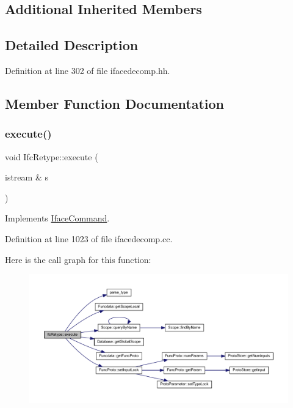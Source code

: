\subsection*{Additional Inherited Members}


\subsection{Detailed Description}


Definition at line 302 of file ifacedecomp.\+hh.



\subsection{Member Function Documentation}
\mbox{\label{class_ifc_retype_a045af05120fda8cc7fa637714db8ca22}} 
\subsubsection{\texorpdfstring{execute()}{execute()}}
{\footnotesize\ttfamily void Ifc\+Retype\+::execute (\begin{DoxyParamCaption}\item[{istream \&}]{s }\end{DoxyParamCaption})\hspace{0.3cm}{\ttfamily [virtual]}}



Implements \mbox{\hyperlink{class_iface_command_af10e29cee2c8e419de6efe9e680ad201}{Iface\+Command}}.



Definition at line 1023 of file ifacedecomp.\+cc.

Here is the call graph for this function\+:
\nopagebreak
\begin{figure}[H]
\begin{center}
\leavevmode
\includegraphics[width=350pt]{class_ifc_retype_a045af05120fda8cc7fa637714db8ca22_cgraph}
\end{center}
\end{figure}


